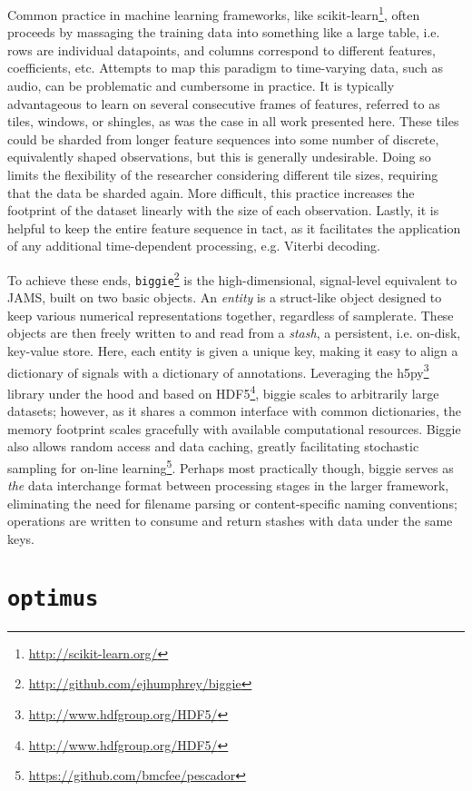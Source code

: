 Common practice in machine learning frameworks, like scikit-learn\footnote{\url{http://scikit-learn.org/}}, often proceeds by massaging the training data into something like a large table, i.e. rows are individual datapoints, and columns correspond to different features, coefficients, etc.
Attempts to map this paradigm to time-varying data, such as audio, can be problematic and cumbersome in practice.
It is typically advantageous to learn on several consecutive frames of features, referred to as tiles, windows, or shingles, as was the case in all work presented here.
These tiles could be sharded from longer feature sequences into some number of discrete, equivalently shaped observations, but this is generally undesirable.
Doing so limits the flexibility of the researcher considering different tile sizes, requiring that the data be sharded again.
More difficult, this practice increases the footprint of the dataset linearly with the size of each observation.
Lastly, it is helpful to keep the entire feature sequence in tact, as it facilitates the application of any additional time-dependent processing, e.g. Viterbi decoding.

To achieve these ends, \texttt{biggie}\footnote{\url{http://github.com/ejhumphrey/biggie}} is the high-dimensional, signal-level equivalent to JAMS, built on two basic objects.
An \emph{entity} is a struct-like object designed to keep various numerical representations together, regardless of samplerate.
These objects are then freely written to and read from a \emph{stash}, a persistent, i.e. on-disk, key-value store.
Here, each entity is given a unique key, making it easy to align a dictionary of signals with a dictionary of annotations.
Leveraging the h5py\footnote{\url{http://www.hdfgroup.org/HDF5/}} library under the hood and based on HDF5\footnote{\url{http://www.hdfgroup.org/HDF5/}}, biggie scales to arbitrarily large datasets;
however, as it shares a common interface with common dictionaries, the memory footprint scales gracefully with available computational resources.
Biggie also allows random access and data caching, greatly facilitating stochastic sampling for on-line learning\footnote{\url{https://github.com/bmcfee/pescador}}.
Perhaps most practically though, biggie serves as \emph{the} data interchange format between processing stages in the larger framework, eliminating the need for filename parsing or content-specific naming conventions; operations are written to consume and return stashes with data under the same keys.


\section{\texttt{optimus}}
\label{sec:optimus}

